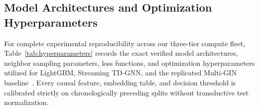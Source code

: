 \documentclass[pdflatex,sn-mathphys,Numbered]{sn-jnl}
\theoremstyle{thmstyleone}
\begin{document}
\begin{appendices}

\section{Model Architectures and Optimization Hyperparameters}\label{sec:appendix_hyperparameters}

For complete experimental reproducibility across our three-tier compute fleet, Table~\ref{tab:hyperparameters} records the exact verified model architectures, neighbor sampling parameters, loss functions, and optimization hyperparameters utilized for LightGBM, Streaming TD-GNN, and the replicated Multi-GIN baseline~\cite{egressy2024multigraph}. Every causal feature, embedding table, and decision threshold is calibrated strictly on chronologically preceding splits without transductive test normalization.


\end{appendices}
\end{document}
